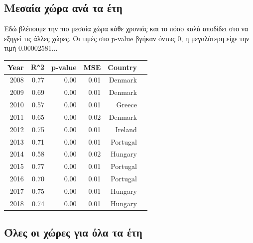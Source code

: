 \documentclass[a4paper,twoside,10pt]{article}
\begin{document}
	\subsection{Μεσαία χώρα ανά τα έτη}
	Εδώ βλέπουμε την πιο μεσαία χώρα κάθε χρονιάς και το πόσο καλά αποδίδει στο να εξηγεί τις άλλες χώρες. Οι τιμές στο p-value βγήκαν όντως 0, η μεγαλύτερη είχε την τιμή 0.00002581...
	\begin{table}[H]
		\centering
		\begin{tabular}{r|rrrrl}
			\hline
			Year & R\verb|^|2 & p-value & MSE & Country \\
			\hline
			2008 & 0.77 & 0.00 & 0.01 & Denmark \\ 
			2009 & 0.69 & 0.00 & 0.01 & Denmark \\
			2010 & 0.57 & 0.00 & 0.01 & Greece \\
			2011 & 0.65 & 0.00 & 0.02 & Denmark \\
			2012 & 0.75 & 0.00 & 0.01 & Ireland \\
			2013 & 0.71 & 0.00 & 0.01 & Portugal \\
			2014 & 0.58 & 0.00 & 0.02 & Hungary \\ 
			2015 & 0.77 & 0.00 & 0.01 & Portugal \\
			2016 & 0.70 & 0.00 & 0.01 & Portugal \\
			2017 & 0.75 & 0.00 & 0.01 & Hungary \\
			2018 & 0.74 & 0.00 & 0.01 & Hungary \\ 
			\hline
		\end{tabular}
	\end{table}
	\subsection{Όλες οι χώρες για όλα τα έτη}
	
\end{document}
